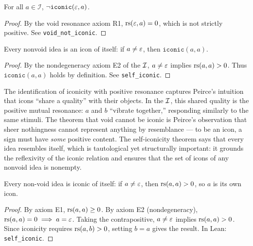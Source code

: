 \begin{theorem}
\label{thm:void-not-iconic}
For all $a \in \mathcal{I}$, $\neg\texttt{iconic}(\varepsilon, a)$.
\end{theorem}

\begin{proof}
By the void resonance axiom R1, $\mathrm{rs}(\varepsilon, a) = 0$, which is not
strictly positive. See \texttt{void\_not\_iconic}.
\end{proof}

\begin{theorem}
\label{thm:self-iconic}
Every nonvoid idea is an icon of itself: if $a \neq \varepsilon$, then
$\texttt{iconic}(a, a)$.
\end{theorem}

\begin{proof}
By the nondegeneracy axiom E2 of the $\mathcal{I}$, $a \neq \varepsilon$ implies
$\mathrm{rs}(a, a) > 0$. Thus $\texttt{iconic}(a, a)$ holds by definition.
See \texttt{self\_iconic}.
\end{proof}

\begin{interpretation}
The identification of iconicity with positive resonance captures
Peirce's intuition that icons ``share a quality'' with their objects.
In the $\mathcal{I}$, this shared quality is the positive mutual resonance: $a$
and $b$ ``vibrate together,'' responding similarly to the same stimuli.
The theorem that void cannot be iconic is Peirce's observation that
sheer nothingness cannot represent anything by resemblance --- to be
an icon, a sign must have \emph{some} positive content. The
self-iconicity theorem says that every idea resembles itself, which is
tautological yet structurally important: it grounds the reflexivity of
the iconic relation and ensures that the set of icons of any nonvoid
idea is nonempty.
\end{interpretation}

\begin{theorem}
\label{thm:self-iconic-firstness}
Every non-void idea is iconic of itself: if $a \neq \varepsilon$, then $\mathrm{rs}(a, a) > 0$, so $a$ is its own icon.
\end{theorem}

\begin{proof}
By axiom E1, $\mathrm{rs}(a, a) \geq 0$. By axiom E2 (nondegeneracy), $\mathrm{rs}(a, a) = 0 \implies a = \varepsilon$. Taking the contrapositive, $a \neq \varepsilon$ implies $\mathrm{rs}(a, a) > 0$. Since iconicity requires $\mathrm{rs}(a, b) > 0$, setting $b = a$ gives the result. In Lean: \texttt{self\_iconic}.
\end{proof}

